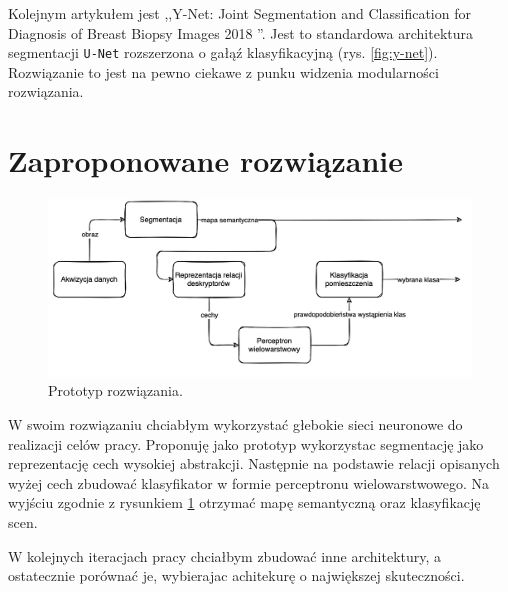 Kolejnym artykułem jest ,,Y-Net: Joint Segmentation and Classification for Diagnosis of Breast Biopsy Images 2018 \cite{mehta2018net}''. Jest to standardowa architektura segmentacji \texttt{U-Net} rozszerzona o gałąź klasyfikacyjną (rys. \ref{fig:y-net}). Rozwiązanie to jest na pewno ciekawe z punku widzenia modularności rozwiązania.

\section{Zaproponowane rozwiązanie}
\begin{figure}[h]
    \includegraphics[width=\textwidth]{images/own-solution.png}
    \caption{Prototyp rozwiązania.}
    \label{fig:prototype}
\end{figure}
W swoim rozwiązaniu chciabłym wykorzystać głebokie sieci neuronowe do realizacji celów pracy. Proponuję jako prototyp wykorzystac segmentację jako reprezentację cech wysokiej abstrakcji. Następnie na podstawie relacji opisanych wyżej cech zbudować klasyfikator w formie perceptronu wielowarstwowego. Na wyjściu zgodnie z rysunkiem \ref{fig:prototype} otrzymać mapę semantyczną oraz klasyfikację scen.

W kolejnych iteracjach pracy chciałbym zbudować inne architektury, a ostatecznie porównać je, wybierajac achitekurę o największej skuteczności.
